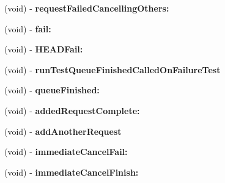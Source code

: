 \begin{DoxyCompactItemize}
\item 
\hypertarget{interface_a_s_i_network_queue_tests_07_08_ac13a2a0cfd430c066079f46e968de949}{
(void) -\/ {\bfseries request\-Failed\-Cancelling\-Others\-:}}
\label{interface_a_s_i_network_queue_tests_07_08_ac13a2a0cfd430c066079f46e968de949}

\item 
\hypertarget{interface_a_s_i_network_queue_tests_07_08_a672f203e09f2d4f39fb2f1824cd85443}{
(void) -\/ {\bfseries fail\-:}}
\label{interface_a_s_i_network_queue_tests_07_08_a672f203e09f2d4f39fb2f1824cd85443}

\item 
\hypertarget{interface_a_s_i_network_queue_tests_07_08_abebd73c6087a317cf7d40a0694fa0554}{
(void) -\/ {\bfseries \-H\-E\-A\-D\-Fail\-:}}
\label{interface_a_s_i_network_queue_tests_07_08_abebd73c6087a317cf7d40a0694fa0554}

\item 
\hypertarget{interface_a_s_i_network_queue_tests_07_08_a863286b45c212a9aff1fd8c9415e8eb8}{
(void) -\/ {\bfseries run\-Test\-Queue\-Finished\-Called\-On\-Failure\-Test}}
\label{interface_a_s_i_network_queue_tests_07_08_a863286b45c212a9aff1fd8c9415e8eb8}

\item 
\hypertarget{interface_a_s_i_network_queue_tests_07_08_a7d969cf7beaae41da4ec7ee5d2f524d4}{
(void) -\/ {\bfseries queue\-Finished\-:}}
\label{interface_a_s_i_network_queue_tests_07_08_a7d969cf7beaae41da4ec7ee5d2f524d4}

\item 
\hypertarget{interface_a_s_i_network_queue_tests_07_08_ab8add5e0479640989a141e56dfcf046a}{
(void) -\/ {\bfseries added\-Request\-Complete\-:}}
\label{interface_a_s_i_network_queue_tests_07_08_ab8add5e0479640989a141e56dfcf046a}

\item 
\hypertarget{interface_a_s_i_network_queue_tests_07_08_a7f9925729daa7cce26bd2301d1b86c2b}{
(void) -\/ {\bfseries add\-Another\-Request}}
\label{interface_a_s_i_network_queue_tests_07_08_a7f9925729daa7cce26bd2301d1b86c2b}

\item 
\hypertarget{interface_a_s_i_network_queue_tests_07_08_ab7c057d1956cb3bda4f21d43260ee1a7}{
(void) -\/ {\bfseries immediate\-Cancel\-Fail\-:}}
\label{interface_a_s_i_network_queue_tests_07_08_ab7c057d1956cb3bda4f21d43260ee1a7}

\item 
\hypertarget{interface_a_s_i_network_queue_tests_07_08_a7d6d1e74ed81581f13c7fa469a78154d}{
(void) -\/ {\bfseries immediate\-Cancel\-Finish\-:}}
\label{interface_a_s_i_network_queue_tests_07_08_a7d6d1e74ed81581f13c7fa469a78154d}


\end{DoxyCompactItemize}

